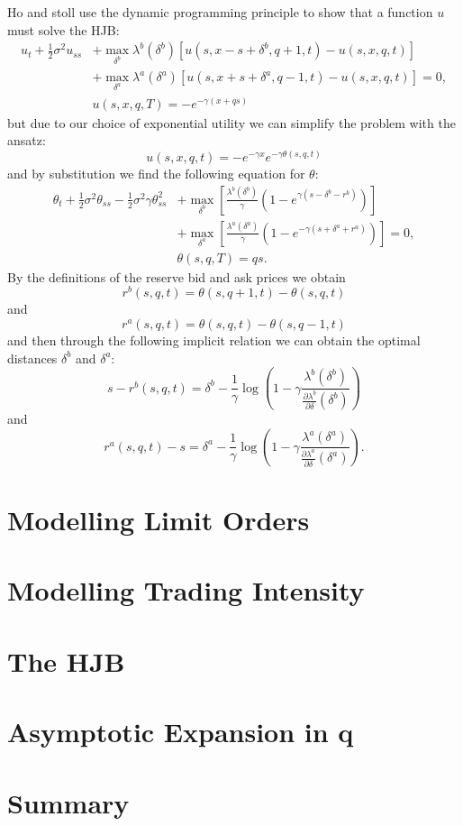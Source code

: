 Ho and stoll use the dynamic programming principle to show that a function $u$ must solve the HJB:
\begin{align*}
    u_t + \frac{1}{2} \sigma^2u_{ss} &+ \max \limits_{ \delta^b } \lambda^b( \delta^b )[ u(s,x-s+\delta^b,q+1,t)-u(s,x,q,t)] \\
    &+\max\limits_{\delta^a}\lambda^a(\delta^a)[u(s,x+s+\delta^a,q-1,t)-u(s,x,q,t)]=0, \\
    & u(s,x,q,T) = -e^{-\gamma(x+qs)}
\end{align*}
but due to our choice of exponential utility we can simplify the problem with the ansatz:
$$u(s,x,q,t)=-e^{-\gamma x}e^{-\gamma\theta(s,q,t)}$$
and by substitution we find the following equation for $\theta:$
\begin{align*}
    \theta_t+\frac{1}{2}\sigma^2\theta_{ss}-\frac{1}{2}\sigma^2\gamma\theta_{ss}^2&+\max\limits_{\delta^b}\left[\frac{\lambda^b(\delta^b)}{\gamma}(1-e^{\gamma(s-\delta^b-r^b)})\right]\\
    &+\max\limits_{\delta^a}\left[\frac{\lambda^a(\delta^a)}{\gamma}(1-e^{-\gamma(s+\delta^a+r^a)})\right]=0,\\
    &\theta(s,q,T)=qs.
\end{align*}
By the definitions of the reserve bid and ask prices we obtain
$$r^b(s,q,t)=\theta(s,q+1,t)-\theta(s,q,t)$$
and
$$r^a(s,q,t)=\theta(s,q,t)-\theta(s,q-1,t)$$
and then through the following implicit relation we can obtain the optimal distances $\delta^b$ and $\delta^a$:
$$s-r^b(s,q,t)=\delta^b-\frac{1}{\gamma}\log\left(1-\gamma\frac{\lambda^b(\delta^b)}{\frac{\partial\lambda^b}{\partial\delta}(\delta^b)}\right)$$
and
$$r^a(s,q,t)-s=\delta^a-\frac{1}{\gamma}\log\left(1-\gamma\frac{\lambda^a(\delta^a)}{\frac{\partial\lambda^a}{\partial\delta}(\delta^a)}\right).$$

\section{Modelling Limit Orders}
\section{Modelling Trading Intensity}
\section{The HJB}
\section{Asymptotic Expansion in q}
\section{Summary}